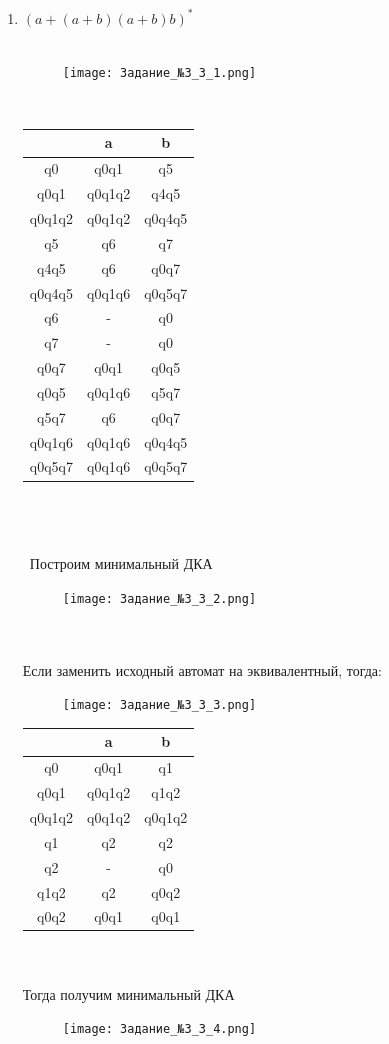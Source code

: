 \documentclass[a4paper]{article}
\begin{document}
\begin{enumerate}
\item $(a+(a+b)(a+b)b)^*$\\
\\
\begin{figure}[h]
\centering
\texttt{[image: Задание\_№3\_3\_1.png]}
\end{figure}
\\
\begin{tabular}{|*{3}{c|}}
\textbf{ } & a & b \\
\hline\hline
q0 & q0q1 & q5 \\
\hline\hline
q0q1 & q0q1q2 & q4q5 \\
\hline\hline
q0q1q2 & q0q1q2 & q0q4q5 \\
\hline\hline
q5 & q6 & q7 \\
\hline\hline
q4q5 & q6 & q0q7 \\
\hline\hline
q0q4q5 & q0q1q6 & q0q5q7 \\
\hline\hline
q6 & - & q0 \\
\hline\hline
q7 & - & q0 \\
\hline\hline
q0q7 & q0q1 & q0q5 \\
\hline\hline
q0q5 & q0q1q6 & q5q7 \\
\hline\hline
q5q7 & q6 & q0q7 \\
\hline\hline
q0q1q6 & q0q1q6 & q0q4q5 \\
\hline\hline
q0q5q7 & q0q1q6 & q0q5q7 \\
\end{tabular}
\\
\\
\\
\ Построим минимальный ДКА \\
\begin{figure}[h]
\centering
\texttt{[image: Задание\_№3\_3\_2.png]}
\end{figure}
\\
\\ Если заменить исходный автомат на эквивалентный, тогда:  \\
\begin{figure}[h]
\centering
\texttt{[image: Задание\_№3\_3\_3.png]}
\end{figure}

\begin{tabular}{|*{3}{c|}}
\textbf{ } & a & b \\
\hline\hline
q0 & q0q1 & q1 \\
\hline\hline
q0q1 & q0q1q2 & q1q2 \\
\hline\hline
q0q1q2 & q0q1q2 & q0q1q2 \\
\hline\hline
q1 & q2 & q2 \\
\hline\hline
q2 & - & q0 \\
\hline\hline
q1q2 & q2 & q0q2 \\
\hline\hline
q0q2 & q0q1 & q0q1 \\
\end{tabular}
\\
\\Тогда получим минимальный ДКА \\
\begin{figure}[h]
\centering
\texttt{[image: Задание\_№3\_3\_4.png]}
\end{figure}


\end{enumerate}
\end{document}
